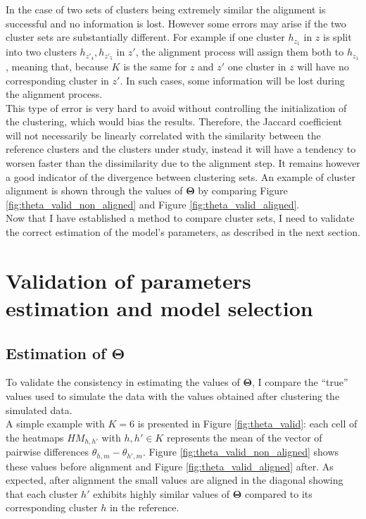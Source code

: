 In the case of two sets of clusters being extremely similar the alignment is successful and no information is lost. However some errors may arise if the two cluster sets are substantially different. For example if one cluster $h_{z_1}$ in $z$ is split into two clusters $h_{z'_4},h_{z'_5}$ in $z'$, the alignment process will assign them both to $h_{z_1}$, meaning that, because $K$ is the same for $z$ and $z'$ one cluster in $z$ will have no corresponding cluster in $z'$. In such cases, some information will be lost during the alignment process.\\

This type of error is very hard to avoid without controlling the initialization of the clustering, which would bias the results. Therefore, the Jaccard coefficient will not necessarily be linearly correlated with the similarity between the reference clusters and the clusters under study, instead it will have a tendency to worsen faster than the dissimilarity due to the alignment step. It remains however a good indicator of the divergence between clustering sets. An example of cluster alignment is shown through the values of $\boldsymbol{\Theta}$ by comparing  Figure \ref{fig:theta_valid_non_aligned} and Figure \ref{fig:theta_valid_aligned}.\\

Now that I have established a method to compare cluster sets, I need to validate the correct estimation of the model's parameters, as described in the next section.


\section{Validation of parameters estimation and model selection}
	\subsection{Estimation of $\boldsymbol{\Theta}$}
	To validate the consistency in estimating the values of $\boldsymbol{\Theta}$, I compare the ``true'' values used to simulate the data with the values obtained after clustering the simulated data.\\
	
	A simple example with $K=6$ is presented in Figure \ref{fig:theta_valid}: each cell of the heatmaps $HM_{h,h'}$ with $h,h' \in K$ represents the mean of the vector of pairwise differences $\theta_{h,m} - \theta_{h',m}$. Figure \ref{fig:theta_valid_non_aligned} shows these values before alignment and Figure \ref{fig:theta_valid_aligned} after. As expected, after alignment the small values are aligned in the diagonal showing that each cluster $h'$ exhibits highly similar values of $\boldsymbol{\Theta}$ compared to its corresponding cluster $h$ in the reference.\\
	 
